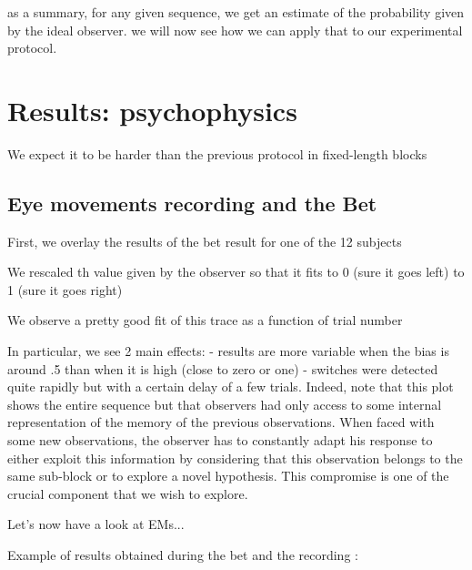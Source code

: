 \documentclass[profile,final,english, draft]{article}%
\begin{document}
as a summary, for any given sequence, we get an estimate of the probability given by the ideal observer. we will now see how we can apply that to our experimental protocol.

\section{Results: psychophysics}

We expect it to be harder than the previous protocol  in fixed-length blocks

\subsection{Eye movements recording and the Bet}

First, we overlay the results of the bet result for one of the 12 subjects

We rescaled th value given by the observer so that it fits to 0 (sure it goes left) to 1 (sure it goes right)

We observe a pretty good fit of this trace as a function of trial number


In particular, we see 2 main effects:
- results are more variable when the bias is around .5 than when it is high (close to zero or one)
- switches were detected quite rapidly but with a certain delay of a few trials. Indeed, note that this plot shows the entire sequence but that observers had only access to some internal representation of the memory of the previous observations. When faced with some new observations, the observer has to constantly adapt his response to either exploit this information by considering that this observation belongs to the same sub-block or to explore a novel hypothesis. This compromise is one of the crucial component that we wish to explore.

Let's now have a look at EMs...

Example of results obtained during the bet and the recording :


\end{document}
